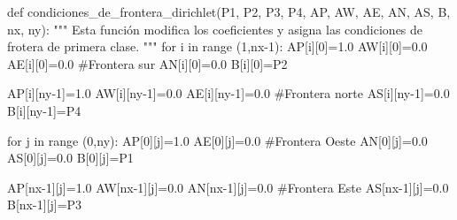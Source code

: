 \documentclass[
  letterpaper,
  DIV=11,
  numbers=noendperiod]{scrreprt}
\newenvironment{Shaded}{\begin{snugshade}}{\end{snugshade}}
\newcommand{\BuiltInTok}[1]{\textcolor[rgb]{0.00,0.23,0.31}{#1}}
\newcommand{\CommentTok}[1]{\textcolor[rgb]{0.37,0.37,0.37}{#1}}
\newcommand{\ControlFlowTok}[1]{\textcolor[rgb]{0.00,0.23,0.31}{#1}}
\newcommand{\DecValTok}[1]{\textcolor[rgb]{0.68,0.00,0.00}{#1}}
\newcommand{\FloatTok}[1]{\textcolor[rgb]{0.68,0.00,0.00}{#1}}
\newcommand{\KeywordTok}[1]{\textcolor[rgb]{0.00,0.23,0.31}{#1}}
\newcommand{\NormalTok}[1]{\textcolor[rgb]{0.00,0.23,0.31}{#1}}
\newcommand{\OperatorTok}[1]{\textcolor[rgb]{0.37,0.37,0.37}{#1}}
\begin{document}
\begin{Shaded}
\begin{Highlighting}[]
\KeywordTok{def}\NormalTok{ condiciones\_de\_frontera\_dirichlet(P1, P2, P3, P4, AP, AW, AE, AN, AS, B, nx, ny):}
    \CommentTok{"""}
\CommentTok{    Esta función modifica los coeficientes y asigna las condiciones de frotera de primera clase. }
\CommentTok{    """}
    \ControlFlowTok{for}\NormalTok{ i }\KeywordTok{in} \BuiltInTok{range}\NormalTok{ (}\DecValTok{1}\NormalTok{,nx}\OperatorTok{{-}}\DecValTok{1}\NormalTok{):}
\NormalTok{        AP[i][}\DecValTok{0}\NormalTok{]}\OperatorTok{=}\FloatTok{1.0}
\NormalTok{        AW[i][}\DecValTok{0}\NormalTok{]}\OperatorTok{=}\FloatTok{0.0}    
\NormalTok{        AE[i][}\DecValTok{0}\NormalTok{]}\OperatorTok{=}\FloatTok{0.0}      \CommentTok{\#Frontera sur}
\NormalTok{        AN[i][}\DecValTok{0}\NormalTok{]}\OperatorTok{=}\FloatTok{0.0}
\NormalTok{        B[i][}\DecValTok{0}\NormalTok{]}\OperatorTok{=}\NormalTok{P2}
            
\NormalTok{        AP[i][ny}\OperatorTok{{-}}\DecValTok{1}\NormalTok{]}\OperatorTok{=}\FloatTok{1.0}
\NormalTok{        AW[i][ny}\OperatorTok{{-}}\DecValTok{1}\NormalTok{]}\OperatorTok{=}\FloatTok{0.0}    
\NormalTok{        AE[i][ny}\OperatorTok{{-}}\DecValTok{1}\NormalTok{]}\OperatorTok{=}\FloatTok{0.0}    \CommentTok{\#Frontera norte}
\NormalTok{        AS[i][ny}\OperatorTok{{-}}\DecValTok{1}\NormalTok{]}\OperatorTok{=}\FloatTok{0.0}
\NormalTok{        B[i][ny}\OperatorTok{{-}}\DecValTok{1}\NormalTok{]}\OperatorTok{=}\NormalTok{P4}

    \ControlFlowTok{for}\NormalTok{ j }\KeywordTok{in} \BuiltInTok{range}\NormalTok{ (}\DecValTok{0}\NormalTok{,ny):}
\NormalTok{        AP[}\DecValTok{0}\NormalTok{][j]}\OperatorTok{=}\FloatTok{1.0}
\NormalTok{        AE[}\DecValTok{0}\NormalTok{][j]}\OperatorTok{=}\FloatTok{0.0}      \CommentTok{\#Frontera Oeste}
\NormalTok{        AN[}\DecValTok{0}\NormalTok{][j]}\OperatorTok{=}\FloatTok{0.0}
\NormalTok{        AS[}\DecValTok{0}\NormalTok{][j]}\OperatorTok{=}\FloatTok{0.0}
\NormalTok{        B[}\DecValTok{0}\NormalTok{][j]}\OperatorTok{=}\NormalTok{P1}
        
\NormalTok{        AP[nx}\OperatorTok{{-}}\DecValTok{1}\NormalTok{][j]}\OperatorTok{=}\FloatTok{1.0}
\NormalTok{        AW[nx}\OperatorTok{{-}}\DecValTok{1}\NormalTok{][j]}\OperatorTok{=}\FloatTok{0.0}
\NormalTok{        AN[nx}\OperatorTok{{-}}\DecValTok{1}\NormalTok{][j]}\OperatorTok{=}\FloatTok{0.0}   \CommentTok{\#Frontera Este}
\NormalTok{        AS[nx}\OperatorTok{{-}}\DecValTok{1}\NormalTok{][j]}\OperatorTok{=}\FloatTok{0.0}
\NormalTok{        B[nx}\OperatorTok{{-}}\DecValTok{1}\NormalTok{][j]}\OperatorTok{=}\NormalTok{P3}
\end{Highlighting}
\end{Shaded}
\end{document}

